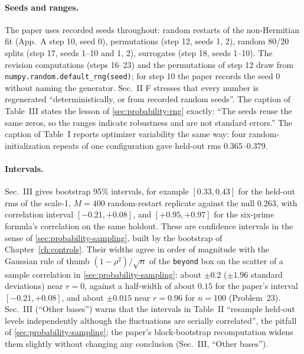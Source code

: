 \paragraph{Seeds and ranges.} The paper uses recorded seeds throughout: random restarts of the non-Hermitian fit (App.~A step 10, seed 0), permutations (step 12, seeds 1, 2), random 80/20 splits (step 17, seeds 1--10 and 1, 2), surrogates (step 18, seeds 1--10). The revision computations (steps 16--23) and the permutations of step 12 draw from \texttt{numpy.random.default\_rng(seed)}; for step 10 the paper records the seed 0 without naming the generator. Sec.~II F stresses that every number is regenerated ``deterministically, or from recorded random seeds''. The caption of Table~III states the lesson of \cref{sec:probability-rng} exactly: ``The seeds reuse the same zeros, so the ranges indicate robustness and are not standard errors.'' The caption of Table~I reports optimizer variability the same way: four random-initialization repeats of one configuration gave held-out rms $0.365$--$0.379$.

\paragraph{Intervals.} Sec.~III gives bootstrap 95\% intervals, for example $[0.33,0.43]$ for the held-out rms of the scale-1, $M=400$ random-restart replicate against the null $0.263$, with correlation interval $[-0.21,+0.08]$, and $[+0.95,+0.97]$ for the six-prime formula's correlation on the same holdout. These are confidence intervals in the sense of \cref{sec:probability-sampling}, built by the bootstrap of Chapter~\ref{ch:controls}. Their widths agree in order of magnitude with the Gaussian rule of thumb $(1-\rho^2)/\sqrt n$ of the \texttt{beyond} box on the scatter of a sample correlation in \cref{sec:probability-sampling}: about $\pm0.2$ ($\pm1.96$ standard deviations) near $r=0$, against a half-width of about $0.15$ for the paper's interval $[-0.21,+0.08]$, and about $\pm0.015$ near $r=0.96$ for $n=100$ (Problem~23). Sec.~III (``Other bases'') warns that the intervals in Table~II ``resample held-out levels independently although the fluctuations are serially correlated'', the pitfall of \cref{sec:probability-sampling}; the paper's block-bootstrap recomputation widens them slightly without changing any conclusion (Sec.~III, ``Other bases'').

